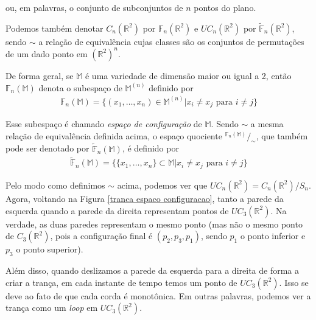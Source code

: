 \documentclass[a4paper,portuguese,11pt,twoside, leqno]{book}
\theoremstyle{definition}
\begin{document}
	\par\vspace{0.3cm} ou, em palavras, o conjunto de subconjuntos de $n$ pontos do plano. 
	\par\vspace{0.3cm} Podemos também denotar $C_n(\mathbb{R}^2)$ por $\mathbb{F}_n(\mathbb{R}^2)$ e $UC_n(\mathbb{R}^2)$ por $\widetilde{\mathbb{F}}_n(\mathbb{R}^2)$, sendo $\sim$ a relação de equivalência cujas classes são os conjuntos de permutações de um dado ponto em $(\mathbb{R}^2)^n$. 
	\par\vspace{0.3cm} De forma geral, se $\mathbb{M}$ é uma variedade de dimensão maior ou igual a 2, então $\mathbb{F}_n(\mathbb{M})$ denota o subespaço de $\mathbb{M}^{(n)}$ definido por
	\begin{align}
	\mathbb{F}_n(\mathbb{M}) = \{ (x_1, \dots, x_n)\in \mathbb{M}^{(n)} | x_i\neq x_j \text{ para }i\neq j \} 
	\label{espaco de configuracao de M}
	\end{align}
	\par\vspace{0.3cm} Esse subespaço é chamado \textit{espaço de configuração} de $\mathbb{M}$. Sendo $\sim$ a mesma relação de equivalência definida acima, o espaço quociente $^{\displaystyle{\mathbb{F}_n(\mathbb{M})}}/_{\sim}$, que também pode ser denotado por $\widetilde{\mathbb{F}}_n(\mathbb{M})$, é definido por
	\begin{align}
	\widetilde{\mathbb{F}}_n(\mathbb{M}) = \{ \{ x_1, \dots, x_n\}\subset\mathbb{M}| x_i\neq x_j \text{ para }i\neq j  \}\label{espaco de configuracao nao ordenado de M}
	\end{align} 
	\par\vspace{0.3cm} Pelo modo como definimos $\sim$ acima, podemos ver que $UC_n(\mathbb{R}^2) = \displaystyle{C_n(\mathbb{R}^2)}/\displaystyle{S_n}$. Agora, voltando na Figura \eqref{tranca espaco configuracao}, tanto a parede da esquerda quando a parede da direita representam pontos de $UC_3(\mathbb{R}^2)$. Na verdade, as duas paredes representam o mesmo ponto (mas não o mesmo ponto de $C_3(\mathbb{R}^2)$, pois a configuração final é $(p_2, p_3, p_1)$, sendo $p_1$ o ponto inferior e $p_3$ o ponto superior). 
	\par\vspace{0.3cm} Além disso, quando deslizamos a parede da esquerda para a direita de forma a criar a trança, em cada instante de tempo temos um ponto de $UC_3(\mathbb{R}^2)$. Isso se deve ao fato de que cada corda é monotônica. Em outras palavras, podemos ver a trança como um \textit{loop} em $UC_3(\mathbb{R}^2)$.
\end{document}
